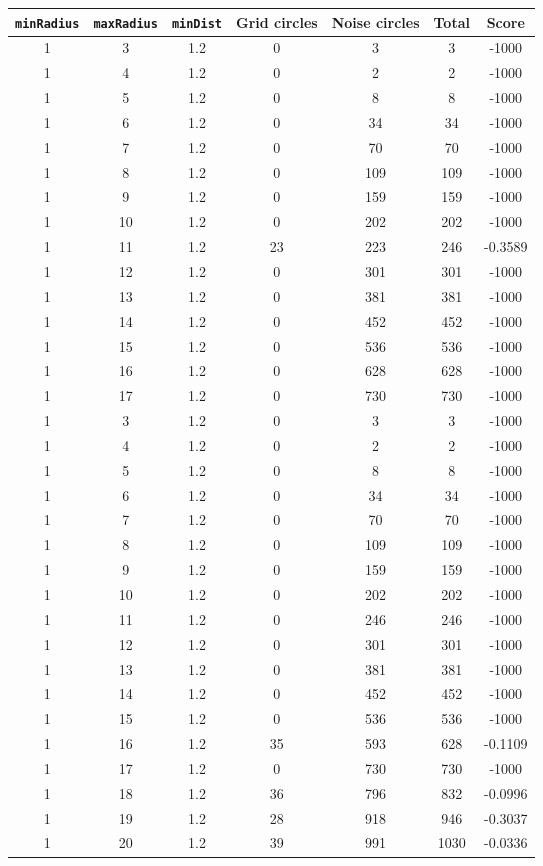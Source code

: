\documentclass[letterpaper, 12pt]{article}
\begin{document}
\begin{longtable}{|c|c|c|c|c|c|c|}
\hline
\textbf{\texttt{minRadius}} & \textbf{\texttt{maxRadius}} & \textbf{\texttt{minDist}} & \textbf{Grid circles} & \textbf{Noise circles} & \textbf{Total} & \textbf{Score} \\
\hline
1 & 3 & 1.2 & 0 & 3 & 3 & -1000 \\
\hline
1 & 4 & 1.2 & 0 & 2 & 2 & -1000 \\
\hline
1 & 5 & 1.2 & 0 & 8 & 8 & -1000 \\
\hline
1 & 6 & 1.2 & 0 & 34 & 34 & -1000 \\
\hline
1 & 7 & 1.2 & 0 & 70 & 70 & -1000 \\
\hline
1 & 8 & 1.2 & 0 & 109 & 109 & -1000 \\
\hline
1 & 9 & 1.2 & 0 & 159 & 159 & -1000 \\
\hline
1 & 10 & 1.2 & 0 & 202 & 202 & -1000 \\
\hline
1 & 11 & 1.2 & 23 & 223 & 246 & -0.3589 \\
\hline
1 & 12 & 1.2 & 0 & 301 & 301 & -1000 \\
\hline
1 & 13 & 1.2 & 0 & 381 & 381 & -1000 \\
\hline
1 & 14 & 1.2 & 0 & 452 & 452 & -1000 \\
\hline
1 & 15 & 1.2 & 0 & 536 & 536 & -1000 \\
\hline
1 & 16 & 1.2 & 0 & 628 & 628 & -1000 \\
\hline
1 & 17 & 1.2 & 0 & 730 & 730 & -1000 \\
\hline
1 & 3 & 1.2 & 0 & 3 & 3 & -1000 \\
\hline
1 & 4 & 1.2 & 0 & 2 & 2 & -1000 \\
\hline
1 & 5 & 1.2 & 0 & 8 & 8 & -1000 \\
\hline
1 & 6 & 1.2 & 0 & 34 & 34 & -1000 \\
\hline
1 & 7 & 1.2 & 0 & 70 & 70 & -1000 \\
\hline
1 & 8 & 1.2 & 0 & 109 & 109 & -1000 \\
\hline
1 & 9 & 1.2 & 0 & 159 & 159 & -1000 \\
\hline
1 & 10 & 1.2 & 0 & 202 & 202 & -1000 \\
\hline
1 & 11 & 1.2 & 0 & 246 & 246 & -1000 \\
\hline
1 & 12 & 1.2 & 0 & 301 & 301 & -1000 \\
\hline
1 & 13 & 1.2 & 0 & 381 & 381 & -1000 \\
\hline
1 & 14 & 1.2 & 0 & 452 & 452 & -1000 \\
\hline
1 & 15 & 1.2 & 0 & 536 & 536 & -1000 \\
\hline
1 & 16 & 1.2 & 35 & 593 & 628 & -0.1109 \\
\hline
1 & 17 & 1.2 & 0 & 730 & 730 & -1000 \\
\hline
1 & 18 & 1.2 & 36 & 796 & 832 & -0.0996 \\
\hline
1 & 19 & 1.2 & 28 & 918 & 946 & -0.3037 \\
\hline
1 & 20 & 1.2 & 39 & 991 & 1030 & -0.0336 \\
\hline
\end{longtable}
\end{document}
